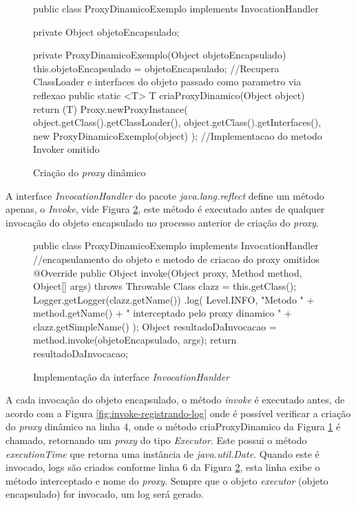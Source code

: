 \begin{figure}[H]
    \centering
    \begin{java}
public class ProxyDinamicoExemplo implements InvocationHandler {
    	private Object objetoEncapsulado;

	private ProxyDinamicoExemplo(Object objetoEncapsulado) {
		this.objetoEncapsulado = objetoEncapsulado;
	}
//Recupera ClassLoader e interfaces do objeto passado como parametro via reflexao
	public static <T> T criaProxyDinamico(Object object) {
		return (T) Proxy.newProxyInstance(
        		object.getClass().getClassLoader(),
        		object.getClass().getInterfaces(),
        		new ProxyDinamicoExemplo(object)
		);
	}
//Implementacao do metodo Invoker omitido
}
    \end{java}
    \caption{Criação do \textit{proxy} dinâmico}
    \label{fig:cria-proxy-dinamico}
\end{figure}


\par A interface \textit{InvocationHandler} do pacote \textit{java.lang.reflect} define um método apenas, o \textit{Invoke}, vide Figura \ref{fig:invoke-implementacao}, este método é executado antes de qualquer invocação do objeto encapsulado no processo anterior de criação do \textit{proxy}.

\begin{figure}[H]
    \centering
\begin{java}
public class ProxyDinamicoExemplo implements InvocationHandler {
//encapsulamento do objeto e metodo de criacao do proxy omitidos
	@Override
	public Object invoke(Object proxy, Method method, Object[] args) throws Throwable {
		Class clazz = this.getClass();
		Logger.getLogger(clazz.getName())
		    .log(
                        Level.INFO, "Metodo " +
                        method.getName() + 
                        " interceptado pelo proxy dinamico " +
                        clazz.getSimpleName()
		    );
		Object resultadoDaInvocacao = method.invoke(objetoEncapsulado, args);
		return resultadoDaInvocacao;
	}
}
\end{java}
\caption{Implementação da interface \textit{InvocationHanlder}}
    \label{fig:invoke-implementacao}
\end{figure}

\par A cada invocação do objeto encapsulado, o método \textit{invoke} é executado antes, de acordo com a Figura \ref{fig:invoke-registrando-log} onde é possível verificar a criação do \textit{proxy} dinâmico na linha 4, onde o método criaProxyDinamico da Figura \ref{fig:cria-proxy-dinamico} é chamado, retornando um \textit{proxy} do tipo \textit{Executor}. Este possui o método \textit{executionTime} que retorna uma instância de \textit{java.util.Date}. Quando este é invocado, logs são criados conforme linha 6 da Figura \ref{fig:invoke-implementacao}, esta linha exibe o método interceptado e nome do \textit{proxy}. Sempre que o objeto \textit{executor} (objeto encapsulado) for invocado, um log será gerado.

